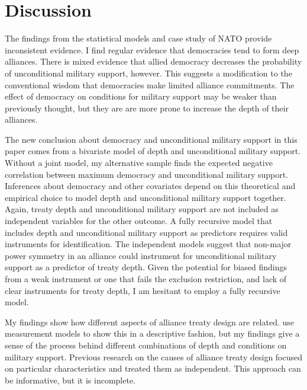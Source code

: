 \documentclass[12pt]{article}
\begin{document}
\section{Discussion}


The findings from the statistical models and case study of NATO provide inconsistent evidence. 
I find regular evidence that democracies tend to form deep alliances.
There is mixed evidence that allied democracy decreases the probability of unconditional military support, however. 
This suggests a modification to the conventional wisdom that democracies make limited alliance commitments.
The effect of democracy on conditions for military support may be weaker than previously thought, but they are are more prone to increase the depth of their alliances. 


The new conclusion about democracy and unconditional military support in this paper comes from a bivariate model of depth and unconditional military support.
Without a joint model, my alternative sample finds the expected negative correlation between maximum democracy and unconditional military support.  
Inferences about democracy and other covariates depend on this theoretical and empirical choice to model depth and unconditional military support together. 
Again, treaty depth and unconditional military support are not included as independent variables for the other outcome. 
A fully recursive model that includes depth and unconditional military support as predictors requires valid instruments for identification. 
The independent models suggest that non-major power symmetry in an alliance could instrument for unconditional military support as a predictor of treaty depth. 
Given the potential for biased findings from a weak instrument or one that fails the exclusion restriction, and lack of clear instruments for treaty depth, I am hesitant to employ a fully recursive model.  



My findings show how different aspects of alliance treaty design are related. 
\citet{BensonClinton2016} use measurement models to show this in a descriptive fashion, but my findings give a sense of the process behind different combinations of depth and conditions on military support. 
Previous research on the causes of alliance treaty design \citep{Benson2012, Mattes2012, Chibaetal2015} focused on particular characteristics and treated them as independent. 
This approach can be informative, but it is incomplete. 
\end{document}
